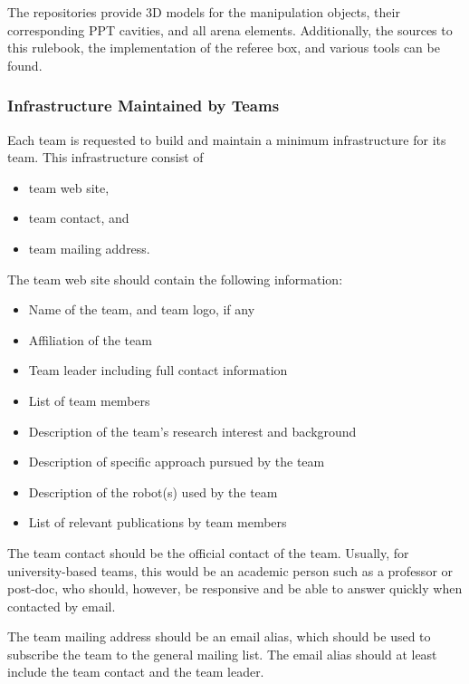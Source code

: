 The repositories provide 3D models for the manipulation objects, their corresponding PPT cavities, and all arena elements. Additionally, the sources to this rulebook, the implementation of the referee box, and various tools can be found.


\subsubsection{Infrastructure Maintained by Teams}
Each team is requested to build and maintain a minimum infrastructure for its team. This infrastructure consist of

\begin{itemize}
	\item team web site,
	\item team contact, and
	\item team mailing address.
\end{itemize}

The team web site should contain the following information:

\begin{itemize}
	\item Name of the team, and team logo, if any
	\item Affiliation of the team
	\item Team leader including full contact information
	\item List of team members
	\item Description of the team's research interest and background
	\item Description of specific approach pursued by the team
	\item Description of the robot(s) used by the team
	\item List of relevant publications by team members

\end{itemize}

The team contact should be the official contact of the team. Usually, for university-based teams, this would be an academic person such as a professor or post-doc, who should, however, be responsive and be able to answer quickly when contacted by email.
\par
The team mailing address should be an email alias, which should be used to subscribe the team to the general \RCAW mailing list. The email alias should at least include the team contact and the team leader.
